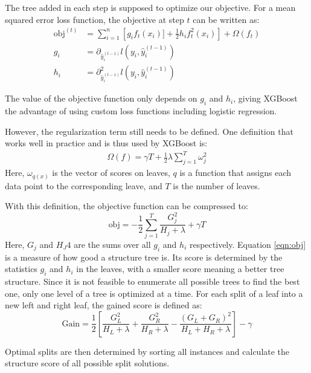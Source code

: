 The tree added in each step is supposed to optimize our objective. For a mean squared error loss function, the objective at step $t$ can be written as:
\begin{align}
  \text{obj}^{(t)} &= \sum_{i=1}^n \left[g_i f_t(x_i)] + \frac{1}{2}h_i f_t^2(x_i)\right] + \Omega(f_t)  \\
  g_i &= \partial_{\hat{y}_i^{(t-1)}} l(y_i, \hat{y}_i^{(t-1)}) \\
  h_i &= \partial^2_{\hat{y}_i^{(t-1)}} l(y_i, \hat{y}_i^{(t-1)})
\end{align}

The value of the objective function only depends on $g_i$ and $h_i$, giving XGBoost the advantage of using custom loss functions including logistic regression.

However, the regularization term still needs to be defined. One definition that works well in practice and is thus used by XGBoost is:
\begin{align}
  \Omega (f) = \gamma T + \frac{1}{2}\lambda \sum_{j=1}^T \omega_j^2
\end{align}
Here, $\omega_{q(x)}$ is the vector of scores on leaves, $q$ is a function that assigns each data point to the corresponding leave, and $T$ is the number of leaves.

With this definition, the objective function can be compressed to:
\begin{equation} \label{eqn:obj}
  \text{obj} = -\frac{1}{2}\sum_{j=1}^T \frac{G_j^2}{H_j + \lambda} + \gamma T
\end{equation}
Here, $G_j$ and $H_J4$ are the sums over all $g_i$ and $h_i$ respectively. Equation \ref{eqn:obj} is a measure of how good a structure tree is. Its score
is determined by the statistics $g_i$ and $h_i$ in the leaves, with a smaller score meaning a better tree structure.
Since it is not feasible to enumerate all possible trees to find the best one, only one level of a tree is optimized at a time.
For each split of a leaf into a new left and right leaf, the gained score is defined as:
\begin{equation}
  \text{Gain} = \frac{1}{2}\left[\frac{G_L^2}{H_L + \lambda} + \frac{G_R^2}{H_R + \lambda} - \frac{(G_L + G_R)^2}{H_L+H_R+\lambda}\right] -\gamma
\end{equation}

Optimal splits are then determined by sorting all instances and calculate the structure score of all possible split solutions.

